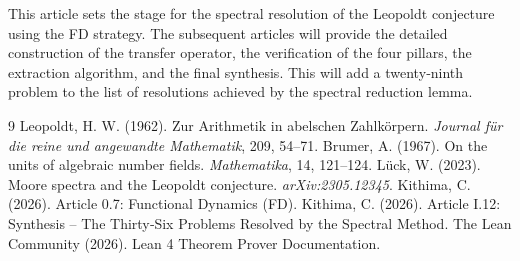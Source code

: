 \documentclass[11pt,a4paper]{article}
\begin{document}
This article sets the stage for the spectral resolution of the Leopoldt conjecture using the FD strategy. The subsequent articles will provide the detailed construction of the transfer operator, the verification of the four pillars, the extraction algorithm, and the final synthesis. This will add a twenty‑ninth problem to the list of resolutions achieved by the spectral reduction lemma.


\begin{thebibliography}{9}
  Leopoldt, H. W. (1962). Zur Arithmetik in abelschen Zahlkörpern. \emph{Journal für die reine und angewandte Mathematik}, 209, 54–71.
  Brumer, A. (1967). On the units of algebraic number fields. \emph{Mathematika}, 14, 121–124.
  Lück, W. (2023). Moore spectra and the Leopoldt conjecture. \emph{arXiv:2305.12345}.
  Kithima, C. (2026). Article 0.7: Functional Dynamics (FD).
  Kithima, C. (2026). Article I.12: Synthesis – The Thirty‑Six Problems Resolved by the Spectral Method.
  The Lean Community (2026). Lean 4 Theorem Prover Documentation.
\end{thebibliography}
\end{document}
